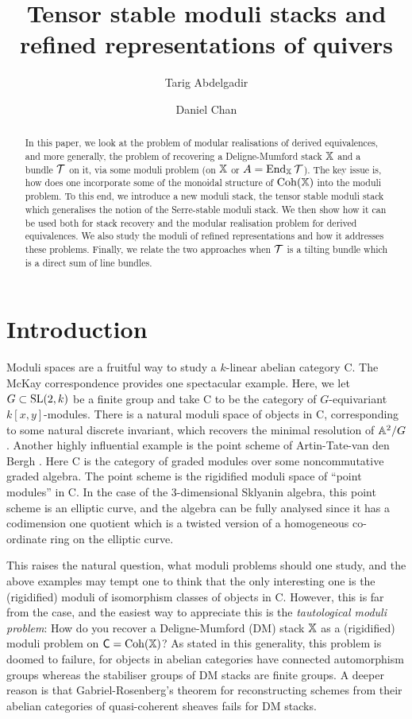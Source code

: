 \documentclass[12pt]{amsart}
\title{Tensor stable moduli stacks and refined representations of quivers}
\author{Tarig Abdelgadir}
\author{Daniel Chan}
\begin{document}
\maketitle

\begin{abstract}
In this paper, we look at the problem of modular realisations of derived equivalences, and more generally, the problem of recovering a Deligne-Mumford stack $\mathbb{X}$ and a bundle $\mathcal{T}$ on it, via some moduli problem (on $\mathbb{X}$ or $A = \operatorname{End}_{\mathbb{X}} \mathcal{T}$). The key issue is, how does one incorporate some of the monoidal structure of $\operatorname{Coh}(\mathbb{X})$ into the moduli problem. To this end, we introduce a new moduli stack, the tensor stable moduli stack which generalises the notion of the Serre-stable moduli stack. We then show how it can be used both for stack recovery and the modular realisation problem for derived equivalences. We also study the moduli of refined representations and how it addresses these problems. Finally, we relate the two approaches when $\mathcal{T}$ is a tilting bundle which is a direct sum of line bundles. 
\end{abstract}

\section{Introduction}

Moduli spaces are a fruitful way to study a $k$-linear abelian category {\sf C}. The McKay correspondence provides one spectacular example. Here, we let $G \subset \operatorname{SL}(2,k)$ be a finite group and take {\sf C} to be the category of $G$-equivariant $k[x,y]$-modules. There is a natural moduli space of objects in {\sf C}, corresponding to some natural discrete invariant, which recovers the minimal resolution of $\mathbb{A}^2/G$. Another highly influential example is the point scheme of Artin-Tate-van den Bergh \cite{ATV90}. Here {\sf C} is the category of graded modules over some noncommutative graded algebra. The point scheme is the rigidified moduli space of ``point modules'' in {\sf C}. In the case of the 3-dimensional Sklyanin algebra, this point scheme is an elliptic curve, and the algebra can be fully analysed since it has a codimension one quotient which is a twisted version of a homogeneous co-ordinate ring on the elliptic curve.

This raises the natural question, what moduli problems should one study, and the above examples may tempt one to think that the only interesting one is the (rigidified) moduli of isomorphism classes of objects in {\sf C}. However, this is far from the case, and the easiest way to appreciate this is the {\em tautological moduli problem}: How do you recover a Deligne-Mumford (DM) stack $\mathbb{X}$ as a (rigidified) moduli problem on $\text{\sf C}=\operatorname{Coh}(\mathbb{X})$? As stated in this generality, this problem is doomed to failure, for objects in abelian categories have connected automorphism groups whereas the stabiliser groups of DM stacks are finite groups. A deeper reason is that Gabriel-Rosenberg's theorem for reconstructing schemes from their abelian categories of quasi-coherent sheaves fails for DM stacks.
\end{document}
